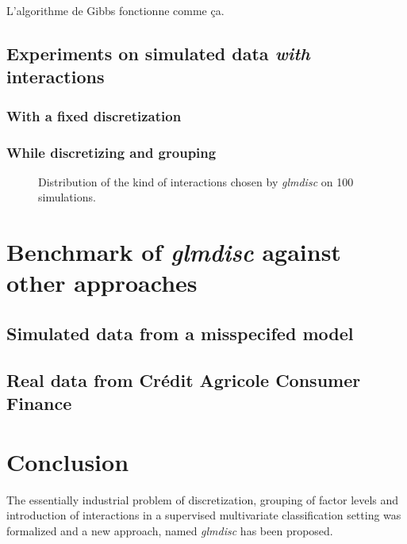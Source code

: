 L'algorithme de Gibbs fonctionne comme ça.

\subsection{Experiments on simulated data \textit{with} interactions}

\subsubsection{With a fixed discretization}





\subsubsection{While discretizing and grouping}

\begin{figure}
\centering
\resizebox{\linewidth}{6cm}{%

}
\caption{\label{fig:simulated_interaction}Distribution of the kind of interactions chosen by \textit{glmdisc} on 100 simulations.}
\end{figure}


\section{Benchmark of \textit{glmdisc} against other approaches} \label{sec:exp}

\subsection{Simulated data from a misspecifed model}

\subsection{Real data from Crédit Agricole Consumer Finance}

\section{Conclusion} \label{sec:ccl}

The essentially industrial problem of discretization, grouping of factor levels and introduction of interactions in a supervised multivariate classification setting was formalized and a new approach, named \textit{glmdisc} has been proposed.

